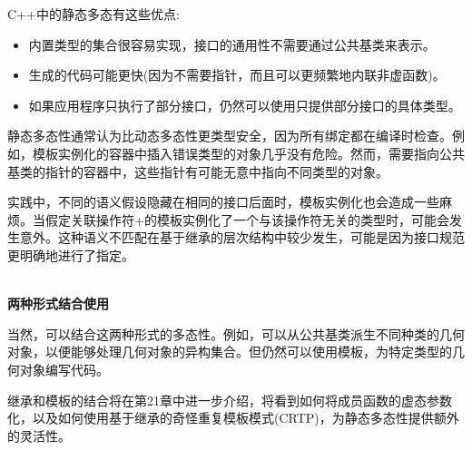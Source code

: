 C++中的静态多态有这些优点:

\begin{itemize}
\item 
内置类型的集合很容易实现，接口的通用性不需要通过公共基类来表示。

\item 
生成的代码可能更快(因为不需要指针，而且可以更频繁地内联非虚函数)。

\item 
如果应用程序只执行了部分接口，仍然可以使用只提供部分接口的具体类型。
\end{itemize}

静态多态性通常认为比动态多态性更类型安全，因为所有绑定都在编译时检查。例如，模板实例化的容器中插入错误类型的对象几乎没有危险。然而，需要指向公共基类的指针的容器中，这些指针有可能无意中指向不同类型的对象。

实践中，不同的语义假设隐藏在相同的接口后面时，模板实例化也会造成一些麻烦。当假定关联操作符+的模板实例化了一个与该操作符无关的类型时，可能会发生意外。这种语义不匹配在基于继承的层次结构中较少发生，可能是因为接口规范更明确地进行了指定。

\hspace*{\fill} \\ %
\noindent
\textbf{两种形式结合使用}

当然，可以结合这两种形式的多态性。例如，可以从公共基类派生不同种类的几何对象，以便能够处理几何对象的异构集合。但仍然可以使用模板，为特定类型的几何对象编写代码。

继承和模板的结合将在第21章中进一步介绍，将看到如何将成员函数的虚态参数化，以及如何使用基于继承的奇怪重复模板模式(CRTP)，为静态多态性提供额外的灵活性。




























